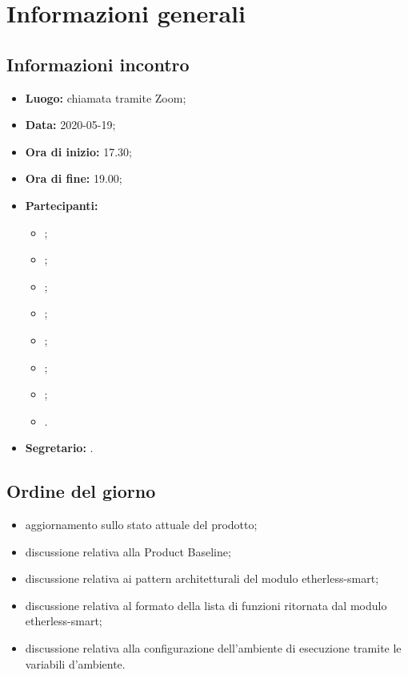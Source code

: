 \section{Informazioni generali}
\subsection{Informazioni incontro}
\begin{itemize}
	\item \textbf{Luogo:} chiamata tramite Zoom;
	\item \textbf{Data:} 2020-05-19;
	\item \textbf{Ora di inizio:} 17.30;
	\item \textbf{Ora di fine:} 19.00;
	\item \textbf{Partecipanti:}
		\begin{itemize}
			\item \VB;
			\item \LB;
			\item \NF;
			\item \EG;
			\item \FJ;
			\item \MP;
			\item \AS;
			\item \AZ.
		\end{itemize}
	\item \textbf{Segretario:} \AZ.
\end{itemize}

\subsection{Ordine del giorno}
\begin{itemize}
	\item aggiornamento sullo stato attuale del prodotto;
	\item discussione relativa alla Product Baseline;
	\item discussione relativa ai pattern architetturali del modulo etherless-smart;
	\item discussione relativa al formato della lista di funzioni ritornata dal modulo etherless-smart;
	\item discussione relativa alla configurazione dell'ambiente di esecuzione tramite le variabili d'ambiente.
\end{itemize}
